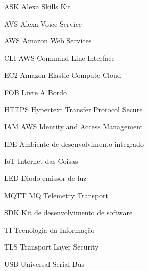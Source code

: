 \documentclass[
	12pt,
	openright,
	twoside,
	a4paper,
	brazil,
]{abntex2}
\begin{document}
\begin{siglas}
    \item[ASK] Alexa Skills Kit
    \item[AVS] Alexa Voice Service
    \item[AWS] Amazon Web Services
    \item[CLI] AWS Command Line Interface
    \item[EC2] Amazon Elastic Compute Cloud
    \item[FOB] Livre A Bordo
    \item[HTTPS] Hypertext Transfer Protocol Secure
    \item[IAM] AWS Identity and Access Management
    \item[IDE] Ambiente de desenvolvimento integrado
    \item[IoT] Internet das Coisas
    \item[LED] Diodo emissor de luz
    \item[MQTT] MQ Telemetry Transport
    \item[SDK] Kit de desenvolvimento de software
    \item[TI] Tecnologia da Informação
    \item[TLS] Transport Layer Security
    \item[USB] Universal Serial Bus
\end{siglas}

\tableofcontents*
\cleardoublepage

\textual




\end{document}
